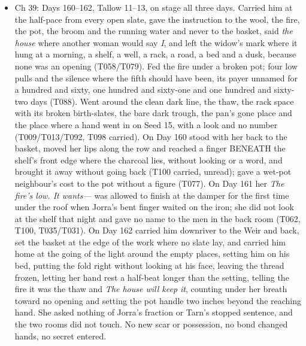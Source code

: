 \documentclass{design/chronicle}
\begin{document}
{\begin{itemize}[leftmargin=1.4em,itemsep=1pt,topsep=3pt,parsep=0pt]
\item Ch 39: Days 160–162, Tallow 11–13, on stage all three days. Carried him at the half-pace from every open slate, gave the instruction to the wool, the fire, the pot, the broom and the running water and never to the basket, said \emph{the house} where another woman would say \emph{I}, and left the widow’s mark where it hung at a morning, a shelf, a well, a rack, a road, a bed and a dusk, because none was an opening (T058/T079). Fed the fire under a broken pot; four low pulls and the silence where the fifth should have been, its payer unnamed for a hundred and sixty, one hundred and sixty-one and one hundred and sixty-two days (T088). Went around the clean dark line, the thaw, the rack space with its broken birth-slates, the bare dark trough, the pan’s gone place and the place where a hand went in on Seed 15, with a look and no number (T009/T013/T092, T098 carried). On Day 160 stood with her back to the basket, moved her lips along the row and reached a finger BENEATH the shelf’s front edge where the charcoal lies, without looking or a word, and brought it away without going back (T100 carried, unread); gave a wet-pot neighbour’s cost to the pot without a figure (T077). On Day 161 her \emph{The fire’s low. It wants---} was allowed to finish at the damper for the first time under the roof when Jorra’s bent finger waited on the iron; she did not look at the shelf that night and gave no name to the men in the back room (T062, T100, T035/T031). On Day 162 carried him downriver to the Weir and back, set the basket at the edge of the work where no slate lay, and carried him home at the going of the light around the empty places, setting him on his bed, putting the fold right without looking at his face, leaving the thread frozen, letting her hand rest a half-beat longer than the setting, telling the fire it was the thaw and \emph{The house will keep it}, counting under her breath toward no opening and setting the pot handle two inches beyond the reaching hand. She asked nothing of Jorra’s fraction or Tarn’s stopped sentence, and the two rooms did not touch. No new scar or possession, no bond changed hands, no secret entered.

\end{itemize}

\begin{itemize}[leftmargin=1.4em,itemsep=1pt,topsep=3pt,parsep=0pt]


\end{itemize}}
\end{document}
